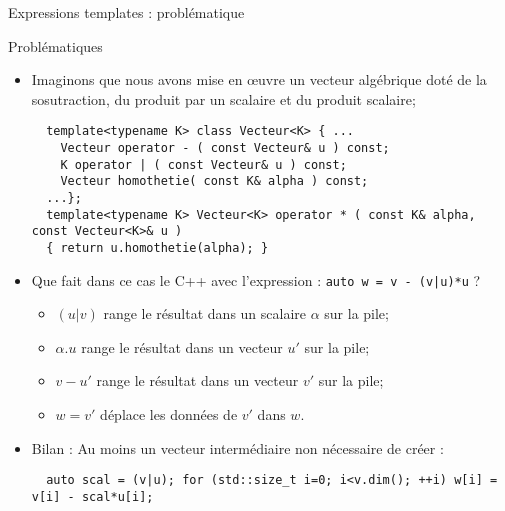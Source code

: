 \documentclass[compress,10pt,aspectratio=169]{beamer}
\begin{document}
\begin{frame}[fragile]{Expressions templates : problématique}
  \scriptsize\vspace*{-4mm}
  
  \begin{alertblock}{Problématiques}
  \begin{itemize}
  \item Imaginons que nous avons mise en {\oe}uvre un vecteur algébrique doté
        de la sosutraction, du produit par un scalaire et du produit scalaire;
  \begin{verbatim}
  template<typename K> class Vecteur<K> { ...
    Vecteur operator - ( const Vecteur& u ) const;
    K operator | ( const Vecteur& u ) const;
    Vecteur homothetie( const K& alpha ) const;
  ...};
  template<typename K> Vecteur<K> operator * ( const K& alpha, const Vecteur<K>& u ) 
  { return u.homothetie(alpha); }
  \end{verbatim}
  \item Que fait dans ce cas le C++ avec l'expression : \texttt{auto w = v - (v|u)*u} ?
  \begin{itemize}
  \scriptsize 
  \item $(u|v)$ range le résultat dans un scalaire $\alpha$ sur la pile;
  \item $\alpha.u$ range le résultat dans un vecteur $u'$ sur la pile;
  \item $v-u'$ range le résultat dans un vecteur $v'$ sur la pile;
  \item $w=v'$ déplace les données de $v'$ dans $w$.
  \end{itemize}
  \item \alert{Bilan} : Au moins un vecteur intermédiaire non nécessaire de créer :
  \begin{verbatim}
  auto scal = (v|u); for (std::size_t i=0; i<v.dim(); ++i) w[i] = v[i] - scal*u[i];
  \end{verbatim}
  \end{itemize}
  \end{alertblock}
  \end{frame}
  
\end{document}
